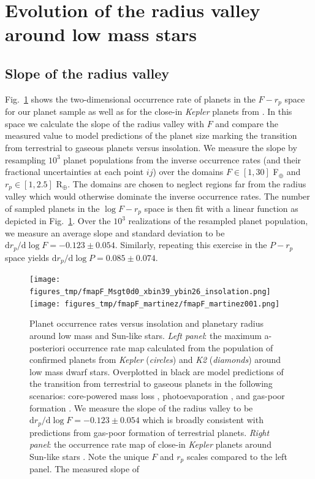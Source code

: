 \documentclass[twocolumn]{emulateapj}
\newcommand{\kepler}[1]{\emph{Kepler}#1}
\newcommand{\ktwo}[1]{\emph{K2}#1}
\begin{document}
\section{Evolution of the radius valley around low mass stars} \label{sect:models}
\subsection{Slope of the radius valley}
Fig.~\ref{fig:fmapF} shows the two-dimensional occurrence rate of planets in the $F-r_p$ space for
our planet sample as well as for the close-in \kepler{} planets from \cite{martinez19}.
In this space we calculate the slope of the radius valley with $F$ and compare the measured value 
to model predictions of the planet size marking the transition from terrestrial to gaseous planets
versus insolation. We measure the slope by resampling $10^3$ planet populations from the inverse
occurrence rates (and their fractional uncertainties at each point $ij$) over the domains
$F\in [1,30]$ F$_{\oplus}$ and $r_p\in [1,2.5]$ R$_{\oplus}$.
The domains are chosen to neglect regions far from the radius valley which would otherwise dominate the
inverse occurrence rates. The number of sampled planets in the $\log{F}-r_p$ space is then fit with a
linear function as depicted in Fig.~\ref{fig:fmapF}. Over the $10^3$ realizations of the resampled planet
population, we measure an average slope and standard deviation to be
$\text{d}r_p / \text{d}\log{F} = -0.123\pm 0.054$. Similarly, repeating this exercise in the $P-r_p$
space yields $\text{d}r_p / \text{d}\log{P} = 0.085\pm 0.074$.


\begin{figure}
  \centering
  \texttt{[image: figures\_tmp/fmapF\_Msgt0d0\_xbin39\_ybin26\_insolation.png]}
  \texttt{[image: figures\_tmp/fmapF\_martinez/fmapF\_martinez001.png]}
  \caption{Planet occurrence rates versus insolation and planetary radius around low mass and Sun-like stars.
    \emph{Left panel}: the maximum a-posteriori occurrence
    rate map calculated from the population of confirmed planets from \kepler{} (\emph{circles}) and
    \ktwo{} (\emph{diamonds}) around low mass dwarf
    stars. Overplotted in black are model predictions of the transition from terrestrial to gaseous
    planets in the following scenarios: core-powered mass loss \citep{gupta19b}, photoevaporation
    \citep{lopez18}, and gas-poor formation \cite{lopez18}. We measure the slope of the radius valley
    to be $\text{d}r_p / \text{d}\log{F} = -0.123\pm 0.054$ which is broadly consistent with predictions
    from gas-poor formation of terrestrial planets. \emph{Right panel}: the occurrence rate map of close-in
    \kepler{} planets around Sun-like stars \citep{martinez19}. Note the unique $F$ and $r_p$ scales compared
    to the left panel. The measured slope of } 
  \label{fig:fmapF}
\end{figure}
\end{document}
